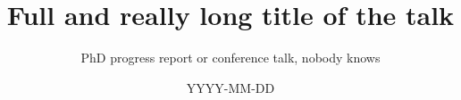 %

\usepackage{graphicx}          %
\usepackage{hyperref}          %
\usepackage{pgf}               %
\usepackage{pgfpages}
\usepackage{fancybox}          %
\usepackage{tikz}              %
\usepackage{amsfonts}          %
\usepackage{xcolor}            %

\usepackage{pifont}            %
\newcommand{\cmark}{\ding{51}}%
\newcommand{\xmark}{\ding{55}}%

\graphicspath{ {./img/} }


\usepackage{fontspec}
\setsansfont{Linux Biolinum O}  %

\title[Short title of the talk]
      {Full and really long title of the talk}

\subtitle{PhD progress report or conference talk, nobody knows}

\date[CONFname]{YYYY-MM-DD}


